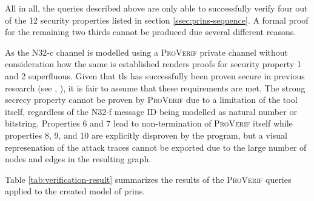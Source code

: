 All in all, the queries described above are only able to successfully verify four out of the 12 security properties listed in section \ref{ssec:prins-sequence}.
A formal proof for the remaining two thirds cannot be produced due several different reasons.

As the N32-c channel is modelled using a \textsc{ProVerif} private channel without consideration how the same is established renders proofs for security property 1 and 2 superfluous.
Given that \gls{tls} has successfully been proven secure in previous research (see \cite{cremers2017comprehensive}, \cite{van2018analysis}), it is fair to assume that these requirements are met.
The strong secrecy property cannot be proven by \textsc{ProVerif} due to a limitation of the tool itself, regardless of the N32-f message ID being modelled as natural number or bitstring.
Properties 6 and 7 lead to non-termination of \textsc{ProVerif} itself while properties 8, 9, and 10 are explicitly disproven by the program, but a visual represenation of the attack traces cannot be exported due to the large number of nodes and edges in the resulting graph.

Table \ref{tab:verification-result} summarizes the results of the \textsc{ProVerif} queries applied to the created model of \gls{prins}.

